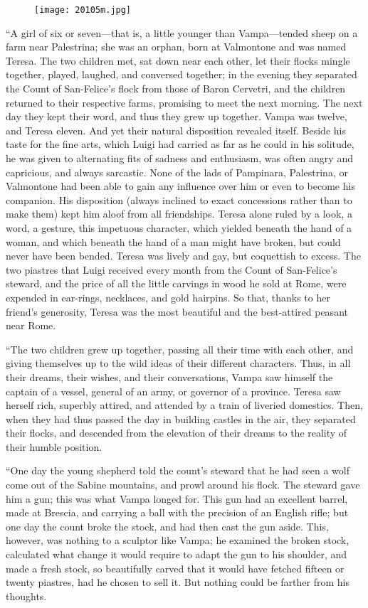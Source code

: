 \begin{figure}[ht]
\texttt{[image: 20105m.jpg]}
\end{figure}

“A girl of six or seven—that is, a little younger than Vampa—tended
sheep on a farm near Palestrina; she was an orphan, born at Valmontone
and was named Teresa. The two children met, sat down near each other,
let their flocks mingle together, played, laughed, and conversed
together; in the evening they separated the Count of San-Felice’s flock
from those of Baron Cervetri, and the children returned to their
respective farms, promising to meet the next morning. The next day they
kept their word, and thus they grew up together. Vampa was twelve, and
Teresa eleven. And yet their natural disposition revealed itself.
Beside his taste for the fine arts, which Luigi had carried as far as
he could in his solitude, he was given to alternating fits of sadness
and enthusiasm, was often angry and capricious, and always sarcastic.
None of the lads of Pampinara, Palestrina, or Valmontone had been able
to gain any influence over him or even to become his companion. His
disposition (always inclined to exact concessions rather than to make
them) kept him aloof from all friendships. Teresa alone ruled by a
look, a word, a gesture, this impetuous character, which yielded
beneath the hand of a woman, and which beneath the hand of a man might
have broken, but could never have been bended. Teresa was lively and
gay, but coquettish to excess. The two piastres that Luigi received
every month from the Count of San-Felice’s steward, and the price of
all the little carvings in wood he sold at Rome, were expended in
ear-rings, necklaces, and gold hairpins. So that, thanks to her
friend’s generosity, Teresa was the most beautiful and the best-attired
peasant near Rome.

“The two children grew up together, passing all their time with each
other, and giving themselves up to the wild ideas of their different
characters. Thus, in all their dreams, their wishes, and their
conversations, Vampa saw himself the captain of a vessel, general of an
army, or governor of a province. Teresa saw herself rich, superbly
attired, and attended by a train of liveried domestics. Then, when they
had thus passed the day in building castles in the air, they separated
their flocks, and descended from the elevation of their dreams to the
reality of their humble position.

“One day the young shepherd told the count’s steward that he had seen a
wolf come out of the Sabine mountains, and prowl around his flock. The
steward gave him a gun; this was what Vampa longed for. This gun had an
excellent barrel, made at Brescia, and carrying a ball with the
precision of an English rifle; but one day the count broke the stock,
and had then cast the gun aside. This, however, was nothing to a
sculptor like Vampa; he examined the broken stock, calculated what
change it would require to adapt the gun to his shoulder, and made a
fresh stock, so beautifully carved that it would have fetched fifteen
or twenty piastres, had he chosen to sell it. But nothing could be
farther from his thoughts.

